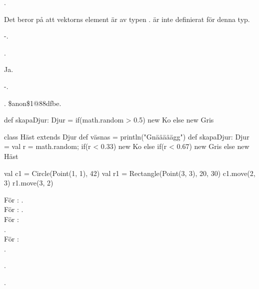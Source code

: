 

\ExerciseSolution{\ExeWeekNINE}

\BasicTasks %

\Task

\Subtask {}.

\Subtask Det beror på att vektorns element är av typen .  är inte definierat för denna typ.

\Subtask -.

\Subtask {}.

\Subtask Ja.

\Subtask -.

\Subtask {}. \$anon\$1@88dfbe.

\Task

\Subtask
\begin{Code}
def skapaDjur: Djur =
   {if(math.random > 0.5) new Ko else new Gris}
\end{Code}

\Subtask
\begin{Code}
class Häst extends Djur{ def väsnas = println("Gnääääägg") }
def skapaDjur: Djur = {val r = math.random;
   if(r < 0.33) new Ko else if(r < 0.67) new Gris else new Häst}
\end{Code}

\Task

\Subtask
\begin{Code}
val c1 = Circle(Point(1, 1), 42)
val r1 = Rectangle(Point(3, 3), 20, 30)
c1.move(2, 3)
r1.move(3, 2)
\end{Code}

\Subtask För : . \\
För : . \\
För :  \\
. \\
För :  \\
.

\Subtask {}.

\Subtask {}.

